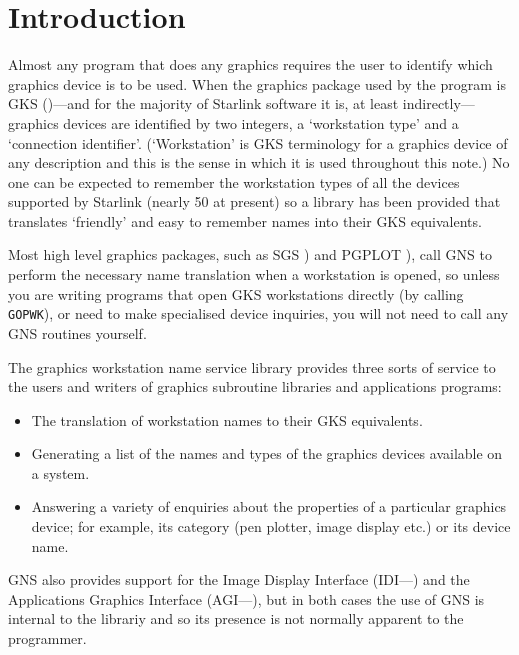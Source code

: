 \section{Introduction}\label{in}

Almost any program that does any graphics requires the user to identify which
graphics device is to be used. When the graphics package used by the program is
GKS ()---and for the majority of Starlink 
software it is, at least indirectly---graphics devices are
identified by two integers, a `workstation type' and a `connection
identifier'. (`Workstation' is GKS terminology for a graphics device of any
description and this is the sense in which it is used throughout this
note.) No one can be expected to remember the workstation types of all the
devices supported by Starlink (nearly 50 at present) so a library has been
provided that translates `friendly' and easy to remember names into their GKS
equivalents.

Most high level graphics packages, such as SGS )
and PGPLOT ), call GNS to
perform the necessary name translation when a workstation is opened, so
unless you are writing programs that open GKS workstations directly
(by calling {\tt GOPWK}), or need to make specialised device inquiries,
you will not need to call any GNS routines yourself.

The graphics workstation name service library provides three sorts of service
to the users and writers of graphics subroutine libraries and applications 
programs:

\begin{itemize}

\item The translation of workstation names to their GKS equivalents.

\item Generating a list of the names and types of the graphics devices
available on a system.

\item Answering a variety of enquiries about the properties of a particular
graphics device; for example, its category (pen plotter, image display
etc.) or its device name.

\end{itemize}

GNS also provides support for the Image Display Interface 
(IDI---) and the
Applications Graphics Interface (AGI---), 
but in both cases the use of GNS
is internal to the librariy and so its presence is not normally
apparent to the programmer.

